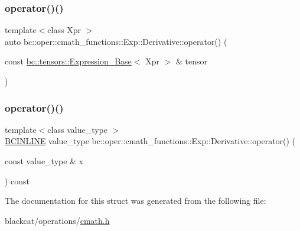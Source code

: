 \mbox{\label{structbc_1_1oper_1_1cmath__functions_1_1Exp_1_1Derivative_a44293d4d220f817edcce619f54fc7c19}} 
\subsubsection{\texorpdfstring{operator()()}{operator()()}\hspace{0.1cm}{\footnotesize\ttfamily [2/3]}}
{\footnotesize\ttfamily template$<$class Xpr $>$ \\
auto bc\+::oper\+::cmath\+\_\+functions\+::\+Exp\+::\+Derivative\+::operator() (\begin{DoxyParamCaption}\item[{const \hyperlink{classbc_1_1tensors_1_1Expression__Base}{bc\+::tensors\+::\+Expression\+\_\+\+Base}$<$ Xpr $>$ \&}]{tensor }\end{DoxyParamCaption})\hspace{0.3cm}{\ttfamily [inline]}}

\mbox{\label{structbc_1_1oper_1_1cmath__functions_1_1Exp_1_1Derivative_ad53636fc2e9440baf0b2932f344ee96c}} 
\subsubsection{\texorpdfstring{operator()()}{operator()()}\hspace{0.1cm}{\footnotesize\ttfamily [3/3]}}
{\footnotesize\ttfamily template$<$class value\+\_\+type $>$ \\
\hyperlink{common_8h_a6699e8b0449da5c0fafb878e59c1d4b1}{B\+C\+I\+N\+L\+I\+NE} value\+\_\+type bc\+::oper\+::cmath\+\_\+functions\+::\+Exp\+::\+Derivative\+::operator() (\begin{DoxyParamCaption}\item[{const value\+\_\+type \&}]{x }\end{DoxyParamCaption}) const\hspace{0.3cm}{\ttfamily [inline]}}



The documentation for this struct was generated from the following file\+:\begin{DoxyCompactItemize}
\item 
blackcat/operations/\hyperlink{cmath_8h}{cmath.\+h}\end{DoxyCompactItemize}
